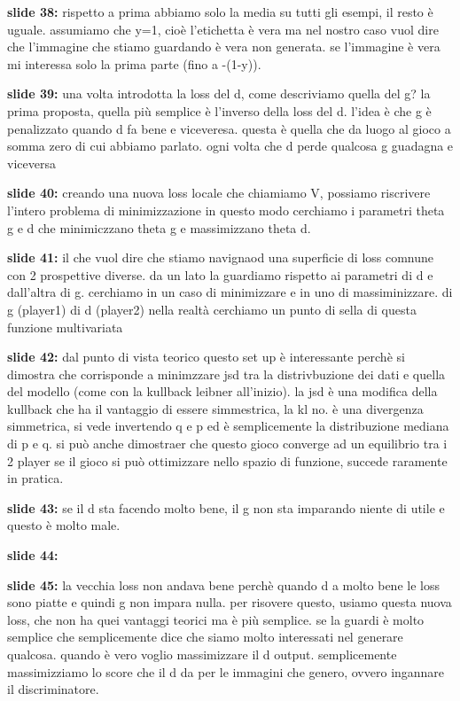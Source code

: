 \textbf{slide 38:} rispetto a prima abbiamo solo la media su tutti gli esempi, il resto è uguale. assumiamo che
y=1, cioè l'etichetta è vera ma nel nostro caso vuol dire che l'immagine che stiamo guardando è vera non
generata. se l'immagine è vera mi interessa solo la prima parte (fino a -(1-y)).

\textbf{slide 39:} una volta introdotta la loss del d, come descriviamo quella del g? la prima proposta, 
quella più semplice è l'inverso della loss del d. l'idea è che g è penalizzato quando d fa bene e 
viceveresa. questa è quella che da luogo al gioco a somma zero di cui abbiamo parlato. ogni volta che d 
perde qualcosa g guadagna e viceversa

\textbf{slide 40:} creando una nuova loss locale che chiamiamo V, possiamo riscrivere l'intero problema di 
minimizzazione in questo modo cerchiamo i parametri theta g e d che minimiczzano theta g e massimizzano 
theta d. 

\textbf{slide 41:} il che vuol dire che stiamo navignaod una superficie di loss comnune con 2 prospettive
diverse. da un lato la guardiamo rispetto ai parametri di d e dall'altra di g. cerchiamo in un caso di 
minimizzare e in uno di massiminizzare. di g (player1) di d (player2) nella realtà cerchiamo un punto 
di sella di questa funzione multivariata

\textbf{slide 42:} dal punto di vista teorico questo set up è interessante perchè si dimostra che corrisponde 
a minimzzare jsd tra la distrivbuzione dei dati e quella del modello (come con la kullback leibner 
all'inizio). la jsd è una modifica della kullback che ha il vantaggio di essere simmestrica, la kl no. 
è una divergenza simmetrica, si vede invertendo q e p ed è semplicemente la distribuzione mediana di p e q. 
si può anche dimostraer che questo gioco converge ad un equilibrio tra i 2 player se il gioco si può 
ottimizzare nello spazio di funzione, succede raramente in pratica.

\textbf{slide 43:} se il d sta facendo molto bene, il g non sta imparando niente di utile e questo è molto 
male. 

\textbf{slide 44:}

\textbf{slide 45:} la vecchia loss non andava bene perchè quando d a molto bene le loss sono piatte e quindi 
g non impara nulla. per risovere questo, usiamo questa nuova loss, che non ha quei vantaggi teorici ma è 
più semplice. se la guardi è molto semplice che semplicemente dice che siamo molto interessati nel generare 
qualcosa. quando è vero voglio massimizzare il d output. semplicemente massimizziamo lo score che il d da per 
le immagini che genero, ovvero ingannare il discriminatore.

